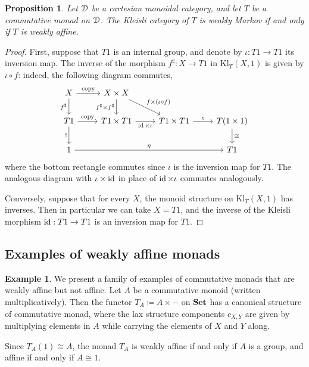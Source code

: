\documentclass[a4paper,UKenglish,numberwithinsect,cleveref, autoref, thm-restate]{lipics-v2021}
\theoremstyle{plain} %
\newtheorem{myproposition}[mytheorem]{Proposition}
\theoremstyle{definition} %
\newtheorem{myexample}[mytheorem]{Example}
\begin{document}
\begin{myproposition}\label{weaklyboth}
 Let $\mathcal{D}$ be a cartesian monoidal category, and let $T$ be a commutative monad on $\mathcal{D}$. The Kleisli category of $T$ is weakly Markov if and only if $T$ is weakly affine.
\end{myproposition}
\begin{proof}
 First, suppose that $T1$ is an internal group, and denote by $\iota:T1\to T1$ its inversion map. 
 The inverse of the morphism $f^\sharp:X\to T1$ in $\mathrm{Kl}_T(X,1)$ is given by $\iota\circ f$: indeed, the following diagram commutes,
 \[
  \begin{tikzcd}
  X \ar{d}[swap]{f^\sharp} \ar{r}{\mathrm{copy}} & X\times X \ar{d}[swap]{f^\sharp\times f^\sharp} \ar{dr}{f\times(\iota\circ f)} \\
  T1 \ar{d}[swap]{!} \ar{r}{\mathrm{copy}} & T1\times T1 \ar{r}[swap]{\id\times\iota} & T1\times T1 \ar{r}{c} & T(1\times 1) \ar{d}{\cong} \\
  1 \ar{rrr}{\eta} &&& T1
  \end{tikzcd}
 \]
 where the bottom rectangle commutes since $\iota$ is the inversion map for $T1$. The analogous diagram with $\iota\times\operatorname{ id}$ in place of $\operatorname{ id}\times\iota$ commutes analogously.
 
 Conversely, suppose that for every $X$, the monoid structure on $\mathrm{Kl}_T(X,1)$ has inverses. Then in particular we can take $X=T1$, and the inverse of the Kleisli morphism $\operatorname{ id}:T1\to T1$ is an inversion map for $T1$. 
\end{proof}


\subsection{Examples of weakly affine monads} 

\begin{myexample}
	\label{ex:abelian_group}
	We present a family of examples of commutative monads that are weakly affine but not affine.
	Let $A$ be a commutative monoid (written multiplicatively).
	Then the functor $T_A \coloneqq A \times -$ on $\mathbf{Set}$ has a canonical structure of commutative monad, 
	where the lax structure components $c_{X,Y}$ are given by multiplying elements in $A$ while carrying the elements 
	of $X$ and $Y$ along.

	Since $T_A(1) \cong A$, the monad $T_A$ is weakly affine if and only if $A$ is a group, and affine if and only if $A\cong 1$.
\end{myexample}
\end{document}
